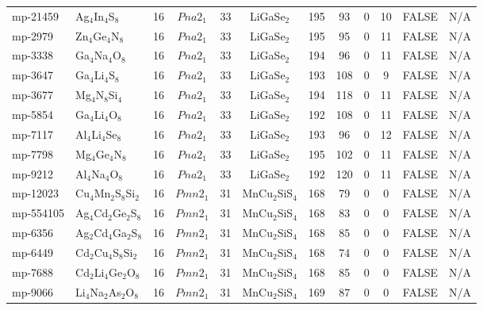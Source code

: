 {\begin{longtable}{llcccccccccc}
    mp-21459 & Ag$_{4}$In$_{4}$S$_{8}$ & 16    & $Pna2_1$ & 33    & LiGaSe$_{2}$ & 195   & 93    & 0     & 10    & FALSE & N/A \\
    mp-2979 & Zn$_{4}$Ge$_{4}$N$_{8}$ & 16    & $Pna2_1$ & 33    & LiGaSe$_{2}$ & 195   & 95    & 0     & 11    & FALSE & N/A \\
    mp-3338 & Ga$_{4}$Na$_{4}$O$_{8}$ & 16    & $Pna2_1$ & 33    & LiGaSe$_{2}$ & 194   & 96    & 0     & 11    & FALSE & N/A \\
    mp-3647 & Ga$_{4}$Li$_{4}$S$_{8}$ & 16    & $Pna2_1$ & 33    & LiGaSe$_{2}$ & 193   & 108   & 0     & 9     & FALSE & N/A \\
    mp-3677 & Mg$_{4}$N$_{8}$Si$_{4}$ & 16    & $Pna2_1$ & 33    & LiGaSe$_{2}$ & 194   & 118   & 0     & 11    & FALSE & N/A \\
    mp-5854 & Ga$_{4}$Li$_{4}$O$_{8}$ & 16    & $Pna2_1$ & 33    & LiGaSe$_{2}$ & 192   & 108   & 0     & 11    & FALSE & N/A \\
    mp-7117 & Al$_{4}$Li$_{4}$Se$_{8}$ & 16    & $Pna2_1$ & 33    & LiGaSe$_{2}$ & 193   & 96    & 0     & 12    & FALSE & N/A \\
    mp-7798 & Mg$_{4}$Ge$_{4}$N$_{8}$ & 16    & $Pna2_1$ & 33    & LiGaSe$_{2}$ & 195   & 102   & 0     & 11    & FALSE & N/A \\
    mp-9212 & Al$_{4}$Na$_{4}$O$_{8}$ & 16    & $Pna2_1$ & 33    & LiGaSe$_{2}$ & 192   & 120   & 0     & 11    & FALSE & N/A \\
    mp-12023 & Cu$_{4}$Mn$_{2}$S$_{8}$Si$_{2}$ & 16    & $Pmn2_1$ & 31    & MnCu$_{2}$SiS$_{4}$ & 168   & 79    & 0     & 0     & FALSE & N/A \\
    mp-554105 & Ag$_{4}$Cd$_{2}$Ge$_{2}$S$_{8}$ & 16    & $Pmn2_1$ & 31    & MnCu$_{2}$SiS$_{4}$ & 168   & 83    & 0     & 0     & FALSE & N/A \\
    mp-6356 & Ag$_{2}$Cd$_{4}$Ga$_{2}$S$_{8}$ & 16    & $Pmn2_1$ & 31    & MnCu$_{2}$SiS$_{4}$ & 168   & 85    & 0     & 0     & FALSE & N/A \\
    mp-6449 & Cd$_{2}$Cu$_{4}$S$_{8}$Si$_{2}$ & 16    & $Pmn2_1$ & 31    & MnCu$_{2}$SiS$_{4}$ & 168   & 74    & 0     & 0     & FALSE & N/A \\
    mp-7688 & Cd$_{2}$Li$_{4}$Ge$_{2}$O$_{8}$ & 16    & $Pmn2_1$ & 31    & MnCu$_{2}$SiS$_{4}$ & 168   & 85    & 0     & 0     & FALSE & N/A \\
    mp-9066 & Li$_{4}$Na$_{2}$As$_{2}$O$_{8}$ & 16    & $Pmn2_1$ & 31    & MnCu$_{2}$SiS$_{4}$ & 169   & 87    & 0     & 0     & FALSE & N/A \\

\end{longtable}}
